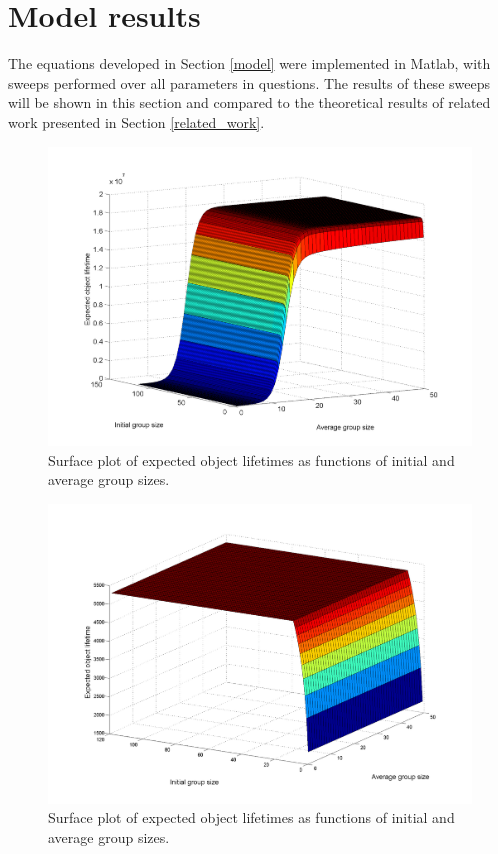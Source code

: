 \documentclass[10pt,a4paper,conference]{IEEEtran}
\begin{document}
\section{Model results}
\label{results}

The equations developed in Section \ref{model} were implemented in Matlab, with sweeps performed over all parameters in questions. The results of these sweeps will be shown in this section and compared to the theoretical results of related work presented in Section \ref{related_work}.

\begin{figure}[htbp]
 \centering
 \includegraphics[clip=true, viewport=2.5cm 1.0cm 27.5cm 19.15cm, width=\columnwidth]{lifetime_av_init_groupsize}
 \caption{Surface plot of expected object lifetimes as functions of initial and average group sizes.}
 \label{fig_markov_example}
\end{figure}

\begin{figure}[htbp]
 \centering
 \includegraphics[clip=true, viewport=2.5cm 1.0cm 27.5cm 19.15cm, width=\columnwidth]{lifetime_av_init_groupsize_norep}
 \caption{Surface plot of expected object lifetimes as functions of initial and average group sizes.}
 \label{fig_markov_example}
\end{figure}
\end{document}
